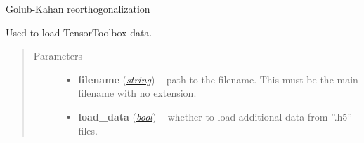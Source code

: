 \documentclass[a4paper,10pt,english]{sphinxmanual}
\begin{document}

\begin{fulllineitems}
\label{api-core:TensorToolbox.core.reort}
Golub-Kahan reorthogonalization

\end{fulllineitems}


\begin{fulllineitems}
\label{api-core:TensorToolbox.core.load}
Used to load TensorToolbox data.
\begin{quote}\begin{description}
\item[{Parameters}] \leavevmode\begin{itemize}
\item {} 
\textbf{filename} (\href{http://docs.python.org/library/string.html\#module-string}{\emph{string}}) -- path to the filename. This must be the main filename with no extension.

\item {} 
\textbf{load\_data} (\href{http://docs.python.org/library/functions.html\#bool}{\emph{bool}}) -- whether to load additional data from ''.h5'' files.

\end{itemize}

\end{description}\end{quote}

\end{fulllineitems}

\end{document}
